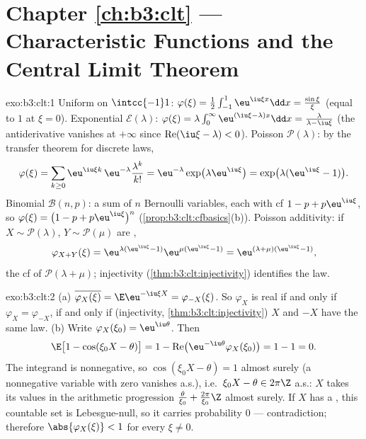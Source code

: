 \section*{Chapter \ref{ch:b3:clt} --- Characteristic
Functions and the Central Limit Theorem}

\begin{solution}{exo:b3:clt:1}
Uniform on $\intcc{-1}1$: $\varphi(\xi) =
\frac12\int_{-1}^1\eu^{\iu\xi x}\dd x =
\frac{\sin\xi}{\xi}$ (equal to $1$ at $\xi = 0$).
Exponential $\mathcal E(\lambda)$: $\varphi(\xi) =
\lambda\int_0^\infty\eu^{(\iu\xi - \lambda)x}\dd x =
\frac{\lambda}{\lambda - \iu\xi}$ (the antiderivative
vanishes at $+\infty$ since $\operatorname{Re}(\iu\xi -
\lambda) < 0$). Poisson $\mathcal P(\lambda)$: by the
transfer theorem for discrete laws,
\[
\varphi(\xi) = \sum_{k\geq0}\eu^{\iu\xi
k}\,\eu^{-\lambda}\frac{\lambda^k}{k!}
= \eu^{-\lambda}\exp\bigl(\lambda\eu^{\iu\xi}\bigr)
= \exp\bigl(\lambda(\eu^{\iu\xi} - 1)\bigr).
\]
Binomial $\mathcal B(n, p)$: a sum of $n$ 
Bernoulli variables, each with cf $1 - p + p\eu^{\iu\xi}$,
so $\varphi(\xi) = \bigl(1 - p + p\eu^{\iu\xi}\bigr)^n$
(\cref{prop:b3:clt:cfbasics}(b)). Poisson additivity: if $X
\sim \mathcal P(\lambda)$, $Y \sim \mathcal P(\mu)$ are
,
\[
\varphi_{X+Y}(\xi) = \eu^{\lambda(\eu^{\iu\xi}-1)}
\eu^{\mu(\eu^{\iu\xi}-1)} =
\eu^{(\lambda+\mu)(\eu^{\iu\xi}-1)},
\]
the cf of $\mathcal P(\lambda + \mu)$; injectivity
(\cref{thm:b3:clt:injectivity}) identifies the law.
\end{solution}

\begin{solution}{exo:b3:clt:2}
(a) $\overline{\varphi_X(\xi)} = \E\eu^{-\iu\xi X} =
\varphi_{-X}(\xi)$. So $\varphi_X$ is real if and only if
$\varphi_X = \varphi_{-X}$, if and only if (injectivity,
\cref{thm:b3:clt:injectivity}) $X$ and $-X$ have the same
law.
(b) Write $\varphi_X(\xi_0) = \eu^{\iu\theta}$. Then
\[
\E\bigl[1 - \cos(\xi_0X - \theta)\bigr]
= 1 - \operatorname{Re}\bigl(\eu^{-\iu\theta}
\varphi_X(\xi_0)\bigr) = 1 - 1 = 0 .
\]
The integrand is nonnegative, so $\cos(\xi_0X - \theta) = 1$
almost surely (a nonnegative variable with zero 
vanishes a.s.), i.e.\ $\xi_0X - \theta \in 2\pi\Z$ a.s.: $X$
takes its values in the arithmetic progression
$\frac{\theta}{\xi_0} + \frac{2\pi}{\xi_0}\Z$ almost surely.
If $X$ has a , this countable set is Lebesgue-null,
so it carries probability $0$ --- contradiction; therefore
$\abs{\varphi_X(\xi)} < 1$ for every $\xi \neq 0$.
\end{solution}

